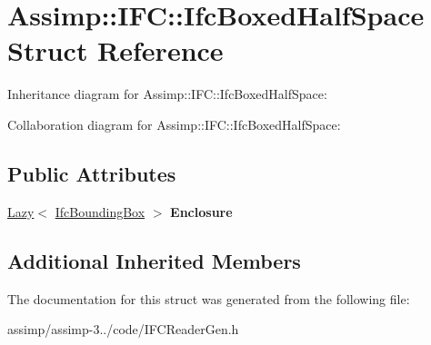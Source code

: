\hypertarget{struct_assimp_1_1_i_f_c_1_1_ifc_boxed_half_space}{\section{Assimp\+:\+:I\+F\+C\+:\+:Ifc\+Boxed\+Half\+Space Struct Reference}
\label{struct_assimp_1_1_i_f_c_1_1_ifc_boxed_half_space}
}


Inheritance diagram for Assimp\+:\+:I\+F\+C\+:\+:Ifc\+Boxed\+Half\+Space\+:


Collaboration diagram for Assimp\+:\+:I\+F\+C\+:\+:Ifc\+Boxed\+Half\+Space\+:
\subsection*{Public Attributes}
\begin{DoxyCompactItemize}
\item 
\hypertarget{struct_assimp_1_1_i_f_c_1_1_ifc_boxed_half_space_af4fd58470b7d4e5b8f914d7e615267a9}{\hyperlink{struct_assimp_1_1_s_t_e_p_1_1_lazy}{Lazy}$<$ \hyperlink{struct_assimp_1_1_i_f_c_1_1_ifc_bounding_box}{Ifc\+Bounding\+Box} $>$ {\bfseries Enclosure}}\label{struct_assimp_1_1_i_f_c_1_1_ifc_boxed_half_space_af4fd58470b7d4e5b8f914d7e615267a9}

\end{DoxyCompactItemize}
\subsection*{Additional Inherited Members}


The documentation for this struct was generated from the following file\+:\begin{DoxyCompactItemize}
\item 
assimp/assimp-\/3../code/I\+F\+C\+Reader\+Gen.\+h\end{DoxyCompactItemize}
